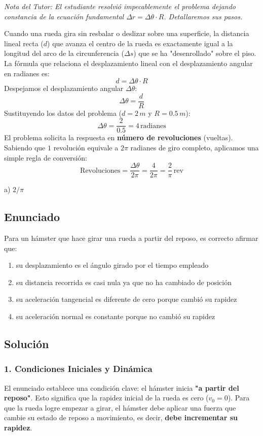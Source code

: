 \documentclass[12pt, a4paper]{article}
\begin{document}
\textit{Nota del Tutor: El estudiante resolvió impecablemente el problema dejando constancia de la ecuación fundamental $\Delta r = \Delta \theta \cdot R$. Detallaremos sus pasos.}

Cuando una rueda gira sin resbalar o deslizar sobre una superficie, la distancia lineal recta ($d$) que avanza el centro de la rueda es exactamente igual a la longitud del arco de la circunferencia ($\Delta s$) que se ha "desenrollado" sobre el piso. 
La fórmula que relaciona el desplazamiento lineal con el desplazamiento angular en radianes es:
$$ d = \Delta \theta \cdot R $$
Despejamos el desplazamiento angular $\Delta \theta$:
$$ \Delta \theta = \frac{d}{R} $$
Sustituyendo los datos del problema ($d = 2\,\si{m}$ y $R = 0.5\,\si{m}$):
$$ \Delta \theta = \frac{2}{0.5} = 4\,\text{radianes} $$
El problema solicita la respuesta en \textbf{número de revoluciones} (vueltas). Sabiendo que $1$ revolución equivale a $2\pi$ radianes de giro completo, aplicamos una simple regla de conversión:
$$ \text{Revoluciones} = \frac{\Delta \theta}{2\pi} = \frac{4}{2\pi} = \frac{2}{\pi}\,\text{rev} $$

\begin{tcolorbox}[colback=green!5!white, colframe=green!50!black, title=Respuesta Final]
\centering \Large a) $2/\pi$
\end{tcolorbox}

\newpage

\subsection*{Enunciado}
Para un hámster que hace girar una rueda a partir del reposo, es correcto afirmar que:
\begin{enumerate}[label=\alph*)]
    \item su desplazamiento es el ángulo girado por el tiempo empleado
    \item su distancia recorrida es casi nula ya que no ha cambiado de posición
    \item su aceleración tangencial es diferente de cero porque cambió su rapidez
    \item su aceleración normal es constante porque no cambió su rapidez
\end{enumerate}

\subsection*{Solución}

\subsubsection*{1. Condiciones Iniciales y Dinámica}
El enunciado establece una condición clave: el hámster inicia \textbf{"a partir del reposo"}. Esto significa que la rapidez inicial de la rueda es cero ($v_0 = 0$). 
Para que la rueda logre empezar a girar, el hámster debe aplicar una fuerza que cambie su estado de reposo a movimiento, es decir, \textbf{debe incrementar su rapidez}.
\end{document}
